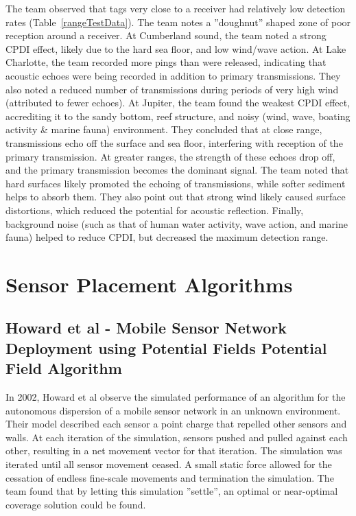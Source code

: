 The team observed that tags very close to a receiver had relatively low detection rates (Table~\ref{rangeTestData}).  The team notes a ''doughnut'' shaped zone of poor reception around a receiver.  At Cumberland sound, the team noted a strong CPDI effect, likely due to the hard sea floor, and low wind/wave action.  At Lake Charlotte, the team recorded more pings than were released, indicating that acoustic echoes were being recorded in addition to primary transmissions.   They also noted a reduced number of transmissions during periods of very high wind (attributed to fewer echoes).  At Jupiter, the team found the weakest CPDI effect, accrediting it to the sandy bottom, reef structure, and noisy (wind, wave, boating activity \& marine fauna) environment.  They concluded that at close range, transmissions echo off the surface and sea floor, interfering with reception of the primary transmission.  At greater ranges, the strength of these echoes drop off, and the primary transmission becomes the dominant signal.  The team noted that hard surfaces likely promoted the echoing of transmissions, while softer sediment helps to absorb them.  They also point out that strong wind likely caused surface distortions, which reduced the potential for acoustic reflection.  Finally, background noise (such as that of human water activity, wave action, and marine fauna) helped to reduce CPDI, but decreased the maximum detection range.


\section{Sensor Placement Algorithms}
\subsection{Howard et al - Mobile Sensor Network Deployment using Potential Fields Potential Field Algorithm}
In 2002, Howard et al observe the simulated performance of an algorithm for the autonomous dispersion of a mobile sensor network in an unknown environment.  Their model described each sensor a point charge that repelled other sensors and walls.  At each iteration of the simulation, sensors pushed and pulled against each other, resulting in a net movement vector for that iteration.  The simulation was iterated until all sensor movement ceased.  A small static force allowed for the cessation of endless fine-scale movements and termination the simulation.  The team found that by letting this simulation ''settle'', an optimal or near-optimal coverage solution could be found.  



